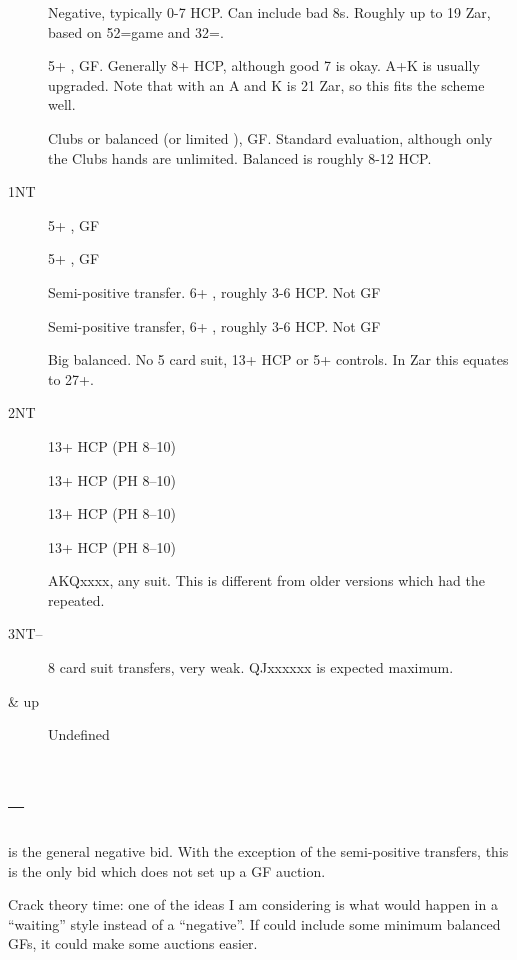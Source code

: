 \documentclass[tom-ari]{subfile}
\begin{document}
	\begin{description}
		\item[] Negative, typically 0-7 HCP.  Can include bad 8s.  Roughly up to 19 Zar, based on 52=game and 32=.
		\item[] 5+ \spadesuit, GF.  Generally 8+ HCP, although good 7 is okay. A+K is usually upgraded.  Note that  with an A and K is 21 Zar, so this fits the scheme well.
		\item[] Clubs or balanced (or limited ), GF.  Standard evaluation, although only the Clubs hands are unlimited.  Balanced is roughly 8-12 HCP.
		\item[1NT] 5+ \heartsuit, GF
		\item[] 5+ \diamondsuit, GF
		\item[] Semi-positive transfer.  6+ \heartsuit, roughly 3-6 HCP.  Not GF
		\item[] Semi-positive transfer, 6+ \spadesuit, roughly 3-6 HCP.  Not GF
		\item[] Big balanced.  No 5 card suit, 13+ HCP or 5+ controls.  In Zar this equates to 27+.
		\item[2NT]  13+ HCP (PH 8--10)
		\item[]  13+ HCP (PH 8--10)
		\item[]  13+ HCP (PH 8--10)
		\item[]  13+ HCP (PH 8--10)
		\item[]  AKQxxxx, any suit.  This is different from older versions which had the  repeated.
		\item[3NT--] 8 card suit transfers, very weak.  QJxxxxxx is expected maximum.
		\item[ \& up] Undefined
	\end{description}
	
	\section[1C--1D]{--}
	
	 is the general negative bid.  With the exception of the semi-positive transfers, this is the only bid which does not set up a GF auction.
	
	Crack theory time:  one of the ideas I am considering is what would happen in a  ``waiting'' style instead of a ``negative''.  If  could include some minimum balanced GFs, it could make some auctions easier.
	
\end{document}

